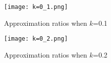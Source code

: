 \begin{figure}[h]
\begin{minipage}[h]{0.45\linewidth}
\centering
\texttt{[image: k=0\_1.png]}
\caption{Approximation ratios when $k$=0.1}
\end{minipage}
\hspace{0.5cm}
\begin{minipage}[h]{0.45\linewidth}
\centering
\texttt{[image: k=0\_2.png]}
\caption{Approximation ratios when $k$=0.2}
\end{minipage}
\end{figure} 
